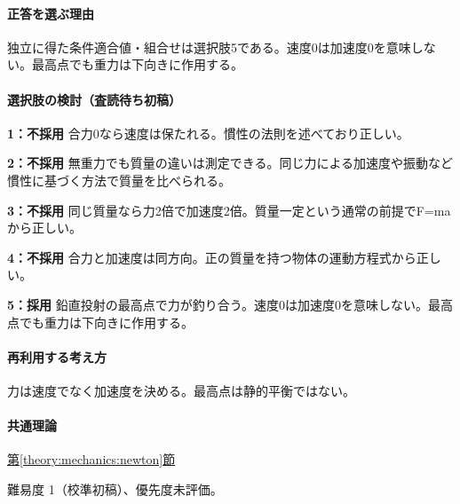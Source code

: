 \paragraph{正答を選ぶ理由} 独立に得た条件適合値・組合せは選択肢5である。速度0は加速度0を意味しない。最高点でも重力は下向きに作用する。

\paragraph{選択肢の検討（査読待ち初稿）}\mbox{}\par

\noindent\textbf{1：不採用} 合力0なら速度は保たれる。慣性の法則を述べており正しい。\par

\noindent\textbf{2：不採用} 無重力でも質量の違いは測定できる。同じ力による加速度や振動など慣性に基づく方法で質量を比べられる。\par

\noindent\textbf{3：不採用} 同じ質量なら力2倍で加速度2倍。質量一定という通常の前提でF=\allowbreak{}maから正しい。\par

\noindent\textbf{4：不採用} 合力と加速度は同方向。正の質量を持つ物体の運動方程式から正しい。\par

\noindent\textbf{5：採用} 鉛直投射の最高点で力が釣り合う。速度0は加速度0を意味しない。最高点でも重力は下向きに作用する。\par

\paragraph{再利用する考え方} 力は速度でなく加速度を決める。最高点は静的平衡ではない。

\paragraph{共通理論} \hyperref[theory:mechanics:newton]{第\ref*{theory:mechanics:newton}節}

\par 難易度 1（校準初稿）、優先度未評価。
